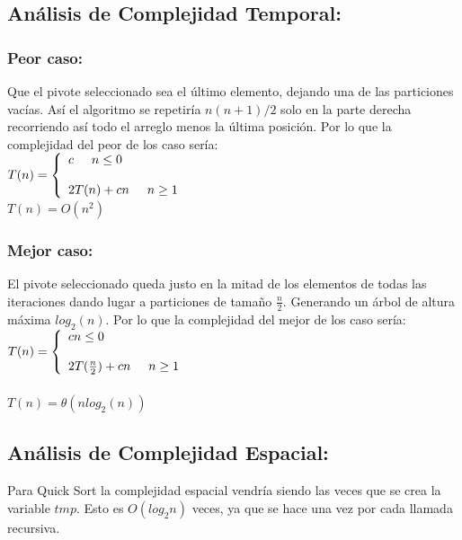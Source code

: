 \documentclass[12pt,spanish]{article}
\theoremstyle{definition}
\begin{document}
\subsection{ Análisis de Complejidad Temporal:}
\subsubsection{Peor caso:}{}
Que el pivote seleccionado sea el último elemento, dejando una de las particiones vacías. Así el algoritmo se repetiría $ n(n+1)/2$ solo en la parte derecha recorriendo así todo el arreglo menos la última posición.
Por lo que la complejidad del peor de los caso sería:\\
$T(n)= \left\{ \begin{array}{lcc}
              c \hspace{0.5cm}  n \leq 0 \\
              \\ 2T(n) +cn \hspace{0.5cm} n \geq 1 \\
              \end{array}
    \right.$ \\
$T(n) = O(n^{2})$

\subsubsection{Mejor caso:}{}
El pivote seleccionado queda justo en la mitad de los elementos de todas las iteraciones dando lugar a particiones de tamaño $\frac{n}{2}$. Generando un árbol de altura máxima $log_{2}(n)$.
Por lo que la complejidad del mejor de los caso sería:\\
$T(n)= \left\{ \begin{array}{lcc}
              c n \leq 0 \\
              \\ 2T(\frac{n}{2}) +cn \hspace{0.5cm} n \geq 1 \\
              \end{array}
    \right.$ \\ \\
$T(n) = \theta(nlog_{2}(n))$

\subsection{ Análisis de Complejidad Espacial:}
Para Quick Sort la complejidad espacial vendría siendo las veces que se crea la variable $tmp$. Esto es $O(log_{2}n)$ veces, ya que se hace una vez por cada llamada recursiva.
\end{document}
